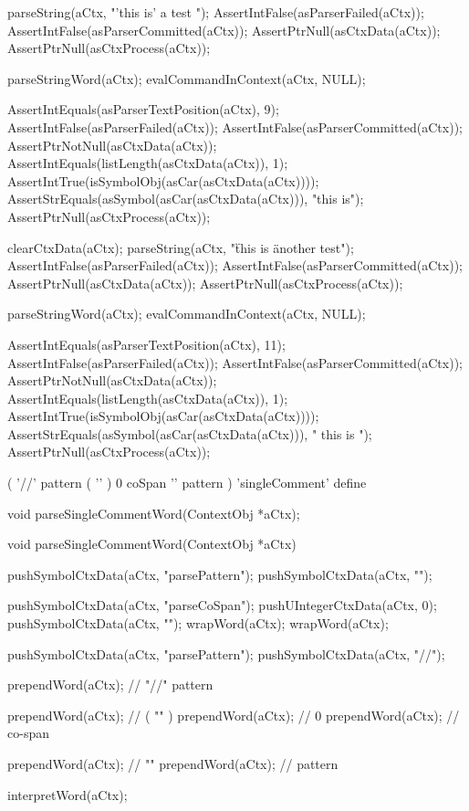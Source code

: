 \startCTest
  parseString(aCtx, "'this is' a test ");
  AssertIntFalse(asParserFailed(aCtx));
  AssertIntFalse(asParserCommitted(aCtx));
  AssertPtrNull(asCtxData(aCtx));
  AssertPtrNull(asCtxProcess(aCtx));
  
  parseStringWord(aCtx);
  evalCommandInContext(aCtx, NULL);
  
  AssertIntEquals(asParserTextPosition(aCtx), 9);
  AssertIntFalse(asParserFailed(aCtx));
  AssertIntFalse(asParserCommitted(aCtx));
  AssertPtrNotNull(asCtxData(aCtx));
  AssertIntEquals(listLength(asCtxData(aCtx)), 1);
  AssertIntTrue(isSymbolObj(asCar(asCtxData(aCtx))));
  AssertStrEquals(asSymbol(asCar(asCtxData(aCtx))), "this is");
  AssertPtrNull(asCtxProcess(aCtx));

  clearCtxData(aCtx);
  parseString(aCtx, "\" this is \" another test");
  AssertIntFalse(asParserFailed(aCtx));
  AssertIntFalse(asParserCommitted(aCtx));
  AssertPtrNull(asCtxData(aCtx));
  AssertPtrNull(asCtxProcess(aCtx));
  
  parseStringWord(aCtx);
  evalCommandInContext(aCtx, NULL);
  
  AssertIntEquals(asParserTextPosition(aCtx), 11);
  AssertIntFalse(asParserFailed(aCtx));
  AssertIntFalse(asParserCommitted(aCtx));
  AssertPtrNotNull(asCtxData(aCtx));
  AssertIntEquals(listLength(asCtxData(aCtx)), 1);
  AssertIntTrue(isSymbolObj(asCar(asCtxData(aCtx))));
  AssertStrEquals(asSymbol(asCar(asCtxData(aCtx))), " this is ");
  AssertPtrNull(asCtxProcess(aCtx));
\stopCTest
\stopTestCase
\stopTestSuite

\startTestSuite[parseSingleCommentWord]

\starttyping
(
  '//' pattern
  ( '\n' ) 0 coSpan
  '\n' pattern
) 'singleComment' define
\stoptyping

\startCHeader
void parseSingleCommentWord(ContextObj *aCtx);
\stopCHeader

\startCCode
void parseSingleCommentWord(ContextObj *aCtx) {

  pushSymbolCtxData(aCtx, "parsePattern");
  pushSymbolCtxData(aCtx, "\n");
  
  pushSymbolCtxData(aCtx, "parseCoSpan");
  pushUIntegerCtxData(aCtx, 0);
  pushSymbolCtxData(aCtx, "\n");
  wrapWord(aCtx);
  wrapWord(aCtx);
  
  pushSymbolCtxData(aCtx, "parsePattern");
  pushSymbolCtxData(aCtx, "//");
  
  prependWord(aCtx); // "//" pattern
  
  prependWord(aCtx); // ( "\n" )
  prependWord(aCtx); // 0
  prependWord(aCtx); // co-span
  
  prependWord(aCtx); // "\n"
  prependWord(aCtx); // pattern
  
  interpretWord(aCtx);
}
\stopCCode

